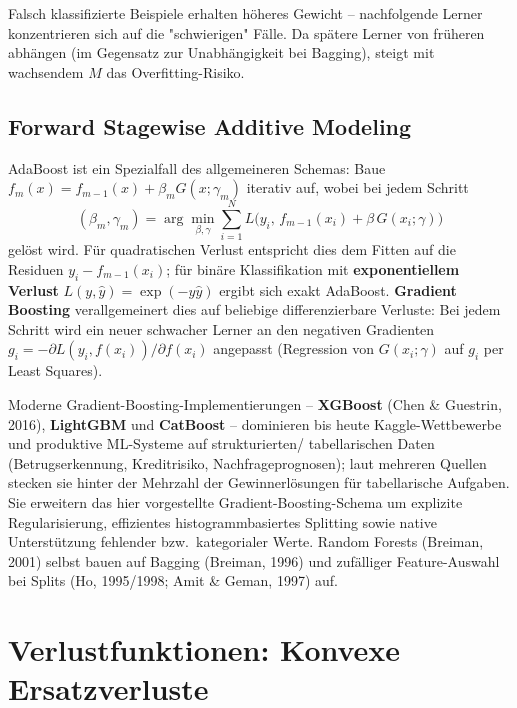 \documentclass[11pt]{article}
\theoremstyle{csthm}
\theoremstyle{csdef}
\begin{document}
Falsch klassifizierte Beispiele erhalten höheres Gewicht -- nachfolgende
Lerner konzentrieren sich auf die "schwierigen" Fälle. Da spätere Lerner von
früheren abhängen (im Gegensatz zur Unabhängigkeit bei Bagging), steigt mit
wachsendem $M$ das Overfitting-Risiko.

\subsection{Forward Stagewise Additive Modeling}

AdaBoost ist ein Spezialfall des allgemeineren Schemas: Baue
$f_m(x) = f_{m-1}(x) + \beta_m G(x;\gamma_m)$ iterativ auf, wobei bei jedem
Schritt
\begin{equation}
  (\beta_m,\gamma_m) = \arg\min_{\beta,\gamma} \sum_{i=1}^N
    L\bigl(y_i,\, f_{m-1}(x_i) + \beta\,G(x_i;\gamma)\bigr)
\end{equation}
gelöst wird. Für quadratischen Verlust entspricht dies dem Fitten auf die
Residuen $y_i - f_{m-1}(x_i)$; für binäre Klassifikation mit
\textbf{exponentiellem Verlust} $L(y,\hat y) = \exp(-y\hat y)$ ergibt sich
exakt AdaBoost. \textbf{Gradient Boosting} verallgemeinert dies auf beliebige
differenzierbare Verluste: Bei jedem Schritt wird ein neuer schwacher Lerner
an den negativen Gradienten $g_i = -\partial L(y_i,f(x_i))/\partial f(x_i)$
angepasst (Regression von $G(x_i;\gamma)$ auf $g_i$ per Least Squares).

\begin{tcolorbox}[webstyle]
Moderne Gradient-Boosting-Implementierungen -- \textbf{XGBoost} (Chen \&
Guestrin, 2016), \textbf{LightGBM} und \textbf{CatBoost} -- dominieren bis
heute Kaggle-Wettbewerbe und produktive ML-Systeme auf strukturierten/
tabellarischen Daten (Betrugserkennung, Kreditrisiko, Nachfrageprognosen);
laut mehreren Quellen stecken sie hinter der Mehrzahl der Gewinnerlösungen
für tabellarische Aufgaben. Sie erweitern das hier vorgestellte
Gradient-Boosting-Schema um explizite Regularisierung, effizientes
histogrammbasiertes Splitting sowie native Unterstützung fehlender bzw.\
kategorialer Werte. Random Forests (Breiman, 2001) selbst bauen auf Bagging
(Breiman, 1996) und zufälliger Feature-Auswahl bei Splits (Ho, 1995/1998;
Amit \& Geman, 1997) auf.
\end{tcolorbox}

\section{Verlustfunktionen: Konvexe Ersatzverluste}
\end{document}
